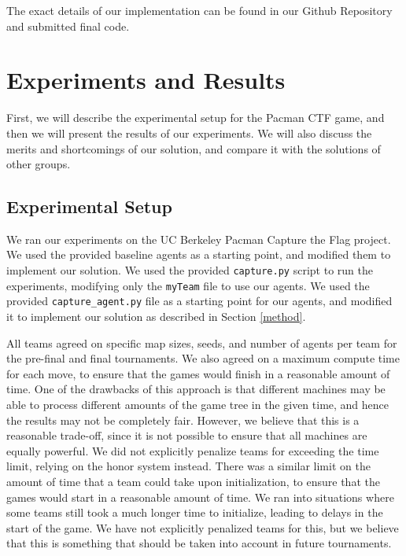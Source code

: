 \documentclass[a4paper,12pt]{article}
\begin{document}
The exact details of our implementation can be found in our Github Repository and submitted final code.

\section{Experiments and Results}
\label{sec:experiments_and_results}

First, we will describe the experimental setup for the Pacman CTF game, and then we will present the results of our experiments. We will also discuss the merits and shortcomings of our solution, and compare it with the solutions of other groups.

\subsection{Experimental Setup}
\label{subsec:experimental_setup}

We ran our experiments on the UC Berkeley Pacman Capture the Flag project. We used the provided baseline agents as a starting point, and modified them to implement our solution. We used the provided \texttt{capture.py} script to run the experiments, modifying only the \texttt{myTeam} file to use our agents. We used the provided \texttt{capture\_agent.py} file as a starting point for our agents, and modified it to implement our solution as described in Section \ref{method}.

All teams agreed on specific map sizes, seeds, and number of agents per team for the pre-final and final tournaments. We also agreed on a maximum compute time for each move, to ensure that the games would finish in a reasonable amount of time. One of the drawbacks of this approach is that different machines may be able to process different amounts of the game tree in the given time, and hence the results may not be completely fair. However, we believe that this is a reasonable trade-off, since it is not possible to ensure that all machines are equally powerful. We did not explicitly penalize teams for exceeding the time limit, relying on the honor system instead. There was a similar limit on the amount of time that a team could take upon initialization, to ensure that the games would start in a reasonable amount of time. We ran into situations where some teams still took a much longer time to initialize, leading to delays in the start of the game. We have not explicitly penalized teams for this, but we believe that this is something that should be taken into account in future tournaments.
\end{document}
